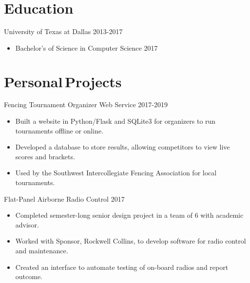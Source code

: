\documentclass[line,margin]{res}
\begin{document}
\begin{resume}
\vspace{-4pt}
\section{Education}
\vspace{12pt}
University of Texas at Dallas \hfill 2013-2017 \\
\vspace{-12pt}
\begin{itemize} \itemsep -2pt
	\item Bachelor's of Science in Computer Science 2017
\end{itemize}

\vspace{-4pt}
\section{Personal\,Projects}
\vspace{12pt}


Fencing Tournament Organizer Web Service
\hfill 2017-2019
	\begin{itemize} \itemsep -2pt
		\item Built a website in Python/Flask and SQLite3 for organizers to run tournaments offline or online.
		\item Developed a database to store results, allowing competitors to view live scores and brackets.
		\item Used by the Southwest Intercollegiate Fencing Association for local tournaments.
	\end{itemize}

\vspace{-6pt}
Flat-Panel Airborne Radio Control
\hfill 2017
	\begin{itemize} \itemsep -2pt
		\item Completed semester-long senior design project in a team of 6 with academic advisor.
		\item Worked with Sponsor, Rockwell Collins, to develop software for radio control and maintenance.
		\item Created an interface to automate testing of on-board radios and report outcome.
	\end{itemize}


\end{resume}
\end{document}
